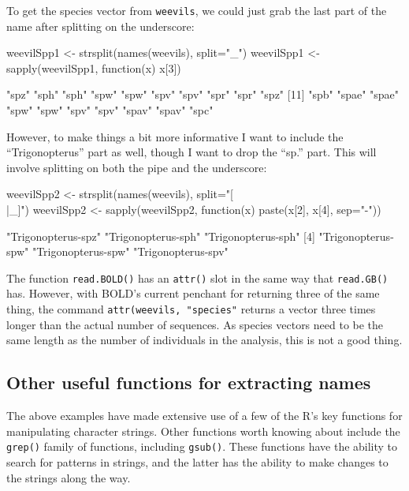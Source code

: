 \documentclass{article}
\newcommand{\progname}[1]{\textsc{#1}}
\newcommand{\fun}[1]{\texttt{#1}}
\begin{document}
To get the species vector from \fun{weevils}, we could just grab the last part of the name after splitting on the underscore:

\begin{console}
weevilSpp1 <- strsplit(names(weevils), split="_")
weevilSpp1 <- sapply(weevilSpp1, function(x) x[3])
\end{console}

\begin{Routput}
  [1] "spz"  "sph"  "sph"  "spw"  "spw"  "spv"  "spv"  "spr"  "spr"  "spz" 
 [11] "spb"  "spae" "spae" "spw"  "spw"  "spv"  "spv"  "spav" "spav" "spc"
\end{Routput}

However, to make things a bit more informative I want to include the ``Trigonopterus'' part as well, though I want to drop the ``sp.'' part. This will involve splitting on both the pipe and the underscore:

\begin{console}
weevilSpp2 <- strsplit(names(weevils), split="[\\|_]")
weevilSpp2 <- sapply(weevilSpp2, function(x) paste(x[2], x[4], sep="-"))
\end{console}

\begin{Routput}
  [1] "Trigonopterus-spz"  "Trigonopterus-sph"  "Trigonopterus-sph" 
  [4] "Trigonopterus-spw"  "Trigonopterus-spw"  "Trigonopterus-spv"
\end{Routput}

The function \fun{read.BOLD()} has an \fun{attr()} slot in the same way that \fun{read.GB()} has. However, with BOLD's current penchant for returning three of the same thing, the command \fun{attr(weevils, "species"} returns a vector three times longer than the actual number of sequences. As species vectors need to be the same length as the number of individuals in the analysis, this is not a good thing.

\subsection{Other useful functions for extracting names}
The above examples have made extensive use of a few of the \progname{R}'s key functions for manipulating character strings. Other functions worth knowing about include the \fun{grep()} family of functions, including \fun{gsub()}. These functions have the ability to search for patterns in strings, and the latter has the ability to make changes to the strings along the way. 
\end{document}
